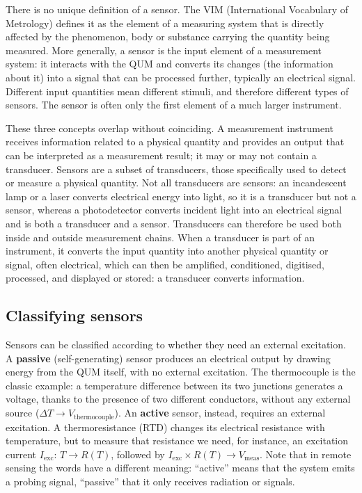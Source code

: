 \documentclass[letterpaper,11pt,leqno]{book}
\begin{document}
There is no unique definition of a sensor. The VIM (International Vocabulary of Metrology) defines it as the element of a measuring system that is directly affected by the phenomenon, body or substance carrying the quantity being measured. More generally, a sensor is the input element of a measurement system: it interacts with the QUM and converts its changes (the information about it) into a signal that can be processed further, typically an electrical signal. Different input quantities mean different stimuli, and therefore different types of sensors. The sensor is often only the first element of a much larger instrument.

These three concepts overlap without coinciding. A measurement instrument receives information related to a physical quantity and provides an output that can be interpreted as a measurement result; it may or may not contain a transducer. Sensors are a subset of transducers, those specifically used to detect or measure a physical quantity. Not all transducers are sensors: an incandescent lamp or a laser converts electrical energy into light, so it is a transducer but not a sensor, whereas a photodetector converts incident light into an electrical signal and is both a transducer and a sensor. Transducers can therefore be used both inside and outside measurement chains. When a transducer is part of an instrument, it converts the input quantity into another physical quantity or signal, often electrical, which can then be amplified, conditioned, digitised, processed, and displayed or stored: a transducer converts information.

\subsection{Classifying sensors}

Sensors can be classified according to whether they need an external excitation. A \textbf{passive} (self-generating) sensor produces an electrical output by drawing energy from the QUM itself, with no external excitation. The thermocouple is the classic example: a temperature difference between its two junctions generates a voltage, thanks to the presence of two different conductors, without any external source ($\Delta T \to V_{\text{thermocouple}}$). An \textbf{active} sensor, instead, requires an external excitation. A thermoresistance (RTD) changes its electrical resistance with temperature, but to measure that resistance we need, for instance, an excitation current $I_{\text{exc}}$: $T \to R(T)$, followed by $I_{\text{exc}} \times R(T) \to V_{\text{meas}}$. Note that in remote sensing the words have a different meaning: ``active'' means that the system emits a probing signal, ``passive'' that it only receives radiation or signals.
\end{document}
